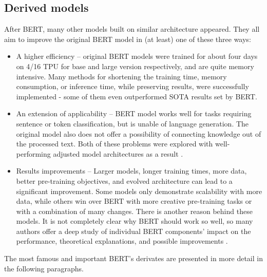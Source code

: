 \subsection{Derived models}
After BERT, many other models built on similar architecture appeared. They all aim to improve the original BERT model in (at least) one of these three ways:
\begin{itemize}
\item A higher efficiency -- original BERT models were trained for about four days on 4/16 TPU for base and large version respectively, and are quite memory intensive. Many methods for shortening the training time, memory consumption, or inference time, while preserving results, were successfully implemented - some of them even outperformed SOTA results set by BERT.
\item An extension of applicability -- BERT model works well for tasks requiring sentence or token classification, but is unable of language generation. The original model also does not offer a possibility of connecting knowledge out of the processed text. Both of these problems were explored with well-performing adjusted model architectures as a result \citep{Zhang2019}.
\item Results improvements -- Larger models, longer training times, more data,  better pre-training objectives, and evolved architecture can lead to a significant improvement. Some models only demonstrate scalability with more data, while others win over BERT with more creative pre-training tasks or with a combination of many changes. There is another reason behind these models. It is not completely clear why BERT should work so well, so many authors offer a deep study of individual BERT components' impact on the performance, theoretical explanations, and possible improvements \citep{Yang2019a,Liu2019}.
\end{itemize}
 The most famous and important BERT's derivates are presented in more detail in the following paragraphs.
